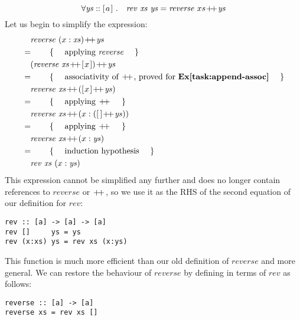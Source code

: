 \begin{displaymath}
\forall \mathit{ys} :: \hslist{a}~. \quad \mathit{rev}~\mathit{xs}~\mathit{ys} = \mathit{reverse}~xs \append \mathit{ys}
\end{displaymath}
Let us begin to simplify the expression:
\begin{align*}
\expr{\mathit{reverse}~(x:\mathit{xs}) \append \mathit{ys}}
\hint{applying $\mathit{reverse}$}
\expr{(\mathit{reverse}~\mathit{xs} \append \hslist{x}) \append \mathit{ys}}
\hint{associativity of $\append$, proved for \textbf{Ex\ref{task:append-assoc}}}
\expr{\mathit{reverse}~\mathit{xs} \append (\hslist{x} \append \mathit{ys})}
\hint{applying $\append$}
\expr{\mathit{reverse}~\mathit{xs} \append (x : (\hslist{} \append \mathit{ys}))}
\hint{applying $\append$}
\expr{\mathit{reverse}~\mathit{xs} \append (x : \mathit{ys})}
\hint{induction hypothesis}
\lastexpr{\mathit{rev}~\mathit{xs}~(x:\mathit{ys})}
\end{align*}
This expression cannot be simplified any further and does no longer contain references to $\mathit{reverse}$ or $\append$, so we use it as the RHS of the second equation of our definition for $\mathit{rev}$:
\begin{verbatim}
rev :: [a] -> [a] -> [a]
rev []     ys = ys
rev (x:xs) ys = rev xs (x:ys)
\end{verbatim} 
This function is much more efficient than our old definition of $\mathit{reverse}$ and more general. We can restore the behaviour of $\mathit{reverse}$ by defining in terms of $\mathit{rev}$ as follows:
\begin{verbatim}
reverse :: [a] -> [a] 
reverse xs = rev xs []
\end{verbatim} 